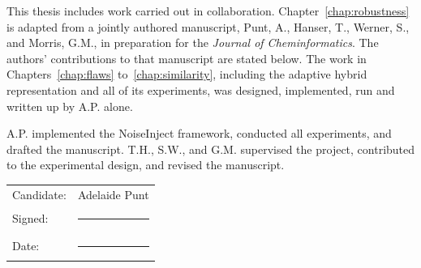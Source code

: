 \documentclass[a4paper,12pt]{report}
\numberwithin{equation}{chapter}
\begin{document}
\vspace{0.8cm}
\noindent
This thesis includes work carried out in collaboration. Chapter~\ref{chap:robustness}
is adapted from a jointly authored manuscript, Punt, A., Hanser, T.,
Werner, S., and Morris, G.M., in preparation for the \textit{Journal of Cheminformatics}.
The authors' contributions to that manuscript are stated below. The work in
Chapters~\ref{chap:flaws} to~\ref{chap:similarity}, including the adaptive hybrid representation
and all of its experiments, was designed, implemented, run and written up by A.P. alone.

\vspace{0.8cm}
\noindent
A.P. implemented the NoiseInject framework, conducted all experiments, and drafted the manuscript.
T.H., S.W., and G.M. supervised the project, contributed to the experimental design, and revised
the manuscript.

\vspace{1.5cm}
\noindent
\begin{tabular}{@{}ll@{}}
Candidate: & Adelaide Punt \\[0.9cm]
Signed:    & \rule{6cm}{0.4pt} \\[0.9cm]
Date:      & \rule{6cm}{0.4pt} \\
\end{tabular}

\end{document}
